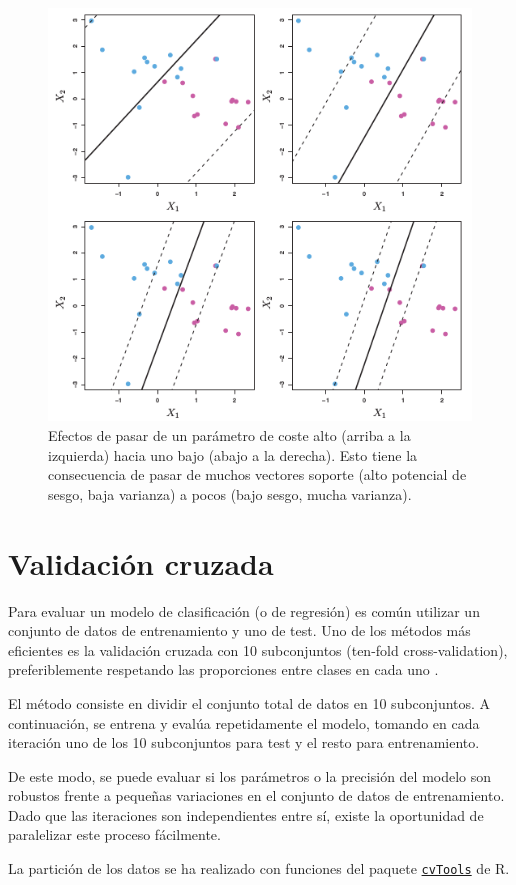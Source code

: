 \documentclass[12pt]{scrartcl}
\begin{document}
\begin{figure}[h]
\centering
\includegraphics [width=12 cm]{svmcost}
\caption{Efectos de pasar de un parámetro de coste alto (arriba a la izquierda) hacia uno bajo (abajo a la derecha). Esto tiene la consecuencia de pasar de muchos vectores soporte (alto potencial de sesgo, baja varianza) a pocos (bajo sesgo, mucha varianza).}
\label{fig:coste}
\end{figure}

\clearpage
\section{Validación cruzada}
Para evaluar un modelo de clasificación (o de regresión) es común utilizar un conjunto de datos de entrenamiento y uno de test. Uno de los métodos más eficientes es la validación cruzada con 10 subconjuntos (ten-fold cross-validation), preferiblemente respetando las proporciones entre clases en cada uno \cite{khv}.\par
El método consiste en dividir el conjunto total de datos en 10 subconjuntos. A continuación, se entrena y evalúa repetidamente el modelo, tomando en cada iteración uno de los 10 subconjuntos para test y el resto para entrenamiento.\par
De este modo, se puede evaluar si los parámetros o la precisión del modelo son robustos frente a pequeñas variaciones en el conjunto de datos de entrenamiento. Dado que las iteraciones son independientes entre sí, existe la oportunidad de paralelizar este proceso fácilmente.\par
La partición de los datos se ha realizado con funciones del paquete \href{http://cran.r-project.org/web/packages/cvTools/index.html}{\texttt{cvTools}} de R.\par
\end{document}
